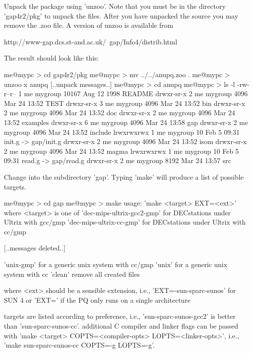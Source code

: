 Unpack the package using 'unzoo'.  Note that you must be in the directory
'gap4r2/pkg' to unpack the files.  After you have unpacked the source you
may remove the .zoo file.  A version of unzoo is available from

\begintt
        http://www-gap.dcs.st-and.ac.uk/~gap/Info4/distrib.html
\endtt

The result should look like this:

\begintt
    me@mypc > cd gap4r2/pkg
    me@mypc > mv ../../anupq.zoo .
    me@mypc > unzoo x anupq
    [..unpack messages..]
    me@mypc > cd anupq
    me@mypc > ls -l
    -rw-r--r--    1 me   mygroup  10167 Aug 12  1998 README
    drwxr-sr-x    2 me   mygroup   4096 Mar 24 13:52 TEST
    drwxr-sr-x    3 me   mygroup   4096 Mar 24 13:52 bin
    drwxr-sr-x    2 me   mygroup   4096 Mar 24 13:52 doc
    drwxr-sr-x    2 me   mygroup   4096 Mar 24 13:52 examples
    drwxr-sr-x    6 me   mygroup   4096 Mar 24 13:58 gap
    drwxr-sr-x    2 me   mygroup   4096 Mar 24 13:52 include
    lrwxrwxrwx    1 me   mygroup     10 Feb  5 09:31 init.g -> gap/init.g
    drwxr-sr-x    2 me   mygroup   4096 Mar 24 13:52 isom
    drwxr-sr-x    2 me   mygroup   4096 Mar 24 13:52 magma
    lrwxrwxrwx    1 me   mygroup     10 Feb  5 09:31 read.g -> gap/read.g
    drwxr-sr-x    2 me   mygroup   8192 Mar 24 13:57 src
\endtt

Change into the subdirectory 'gap'.  Typing 'make' will produce a list of
possible targets.

\begintt
me@mypc > cd gap
me@mypc > make
usage: 'make <target> EXT=<ext>'  where <target> is one of
'dec-mips-ultrix-gcc2-gmp' for DECstations under Ultrix with gcc/gmp
'dec-mips-ultrix-cc-gmp'   for DECstations under Ultrix with cc/gmp

 [..messages deleted..]

'unix-gmp'                 for a generic unix system with cc/gmp
'unix'                     for a generic unix system with cc
'clean'                    remove all created files

   where <ext> should be a sensible extension, i.e.,
   'EXT=-sun-sparc-sunos' for SUN 4 or 'EXT=' if the PQ only
   runs on a single architecture

   targets are listed according to preference,
   i.e., 'sun-sparc-sunos-gcc2' is better than 'sun-sparc-sunos-cc'.
   additional C compiler and linker flags can be passed with
   'make <target> COPTS=<compiler-opts> LOPTS=<linker-opts>',
   i.e., 'make sun-sparc-sunos-cc COPTS=-g LOPTS=-g'.

